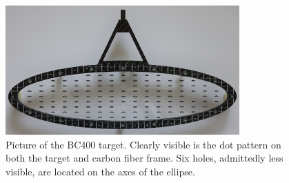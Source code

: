 \begin{refsection}
        \begin{figure}
            \centering
            \includegraphics[width = 0.8\textwidth]{Figures/MEG/meg_target.png}
            \caption{Picture of the BC400 target. Clearly visible is the dot pattern on both the target and carbon fiber frame. Six holes, admittedly less visible, are located on the axes of the ellipse.}
            \label{fig:meg:target}
        \end{figure}


\end{refsection}
